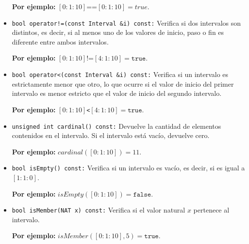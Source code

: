\begin{itemize}
    \begin{center}
        \textbf{Por ejemplo:} $[0: 1: 10] \texttt{==} [0: 1: 10] = true$.
    \end{center}
        
    \item \texttt{bool operator!=(const Interval \&i) const:}  
    Verifica si dos intervalos son distintos, es decir, si al menos uno de los valores de inicio, paso o fin es diferente entre ambos intervalos. 

    \begin{center}
        \textbf{Por ejemplo:} $[0: 1: 10] \texttt{!=} [4: 1: 10] = \texttt{true}$.
    \end{center}
    
    \item \texttt{bool operator<(const Interval \&i) const:}  
    Verifica si un intervalo es estrictamente menor que otro, lo que ocurre si el valor de inicio del primer intervalo es menor estricto que el valor de inicio del segundo intervalo.

    \begin{center}
        \textbf{Por ejemplo:} $[0: 1: 10]$\texttt{<}$[4: 1: 10] = \texttt{true}$.
    \end{center}


    \item \texttt{unsigned int cardinal() const:}  
    Devuelve la cantidad de elementos contenidos en el intervalo. Si el intervalo está vacío, devuelve cero.

    \begin{center}
        \textbf{Por ejemplo:} $cardinal([0: 1: 10]) = 11$.
    \end{center}

    \item \texttt{bool isEmpty() const:}  
    Verifica si un intervalo es vacío, es decir, si es igual a $[1: 1: 0]$. 

    \begin{center}
    \textbf{Por ejemplo:} $isEmpty([0: 1: 10])=\texttt{false}$.
    \end{center}
    
    \item \texttt{bool isMember(NAT x) const:}  
    Verifica si el valor natural $x$ pertenece al intervalo.

    \begin{center}
        \textbf{Por ejemplo:} $isMember([0: 1: 10],5)=\texttt{true}$.
    \end{center}
    

\end{itemize}
